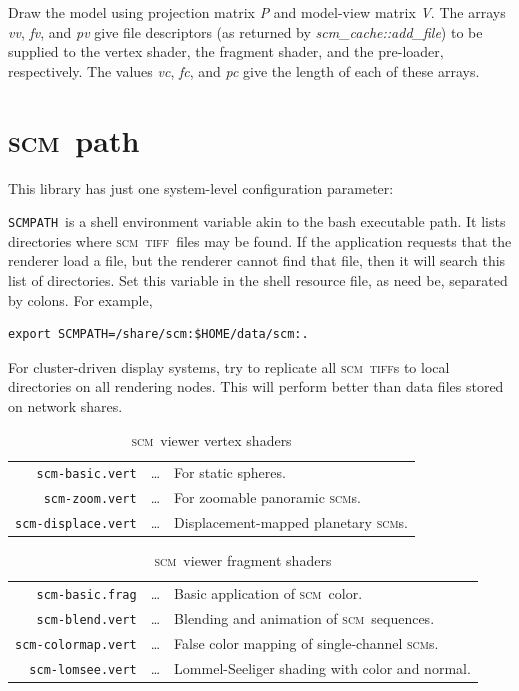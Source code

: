 \documentclass[oneside,10pt]{memoir}
\newcommand{\scm}     {\textsc{scm}}
\newcommand{\tiff}    {\textsc{tiff}}
\newcommand{\scmpath}{\texttt{SCMPATH}}
\newcommand{\B}{\bigstrut[b]}
\newcommand{\T}{\bigstrut[t]}
\begin{document}
\begin{Spacing}{1.1}
\begin{itemize}
    Draw the model using projection matrix \textit{P} and model-view matrix \textit{V}. The arrays \textit{vv}, \textit{fv}, and \textit{pv} give file descriptors (as returned by \textit{scm\_cache::add\_file}) to be supplied to the vertex shader, the fragment shader, and the pre-loader, respectively. The values \textit{vc}, \textit{fc}, and \textit{pc} give the length of each of these arrays.

\end{itemize}

\section{\scm\ path}
\label{sec:scmpath}

This library has just one system-level configuration parameter:

\scmpath\ is a shell environment variable akin to the bash executable path. It lists directories where \scm\ \tiff\ files may be found. If the application requests that the renderer load a file, but the renderer cannot find that file, then it will search this list of directories. Set this variable in the shell resource file, as need be, separated by colons. For example,

\begin{Verbatim}
export SCMPATH=/share/scm:$HOME/data/scm:.
\end{Verbatim}

For cluster-driven display systems, try to replicate all \scm\ \tiff s to local directories on all rendering nodes. This will perform better than data files stored on network shares.

\begin{table}
  \begin{tabular*}{\textwidth}{rcl}\hline
    \texttt{scm-basic.vert}    & \ldots & For static spheres. \T\\
    \texttt{scm-zoom.vert}     & \ldots & For zoomable panoramic \scm s. \\
    \texttt{scm-displace.vert} & \ldots & Displacement-mapped planetary \scm s. \B\\\hline
  \end{tabular*}
  \caption{\scm\ viewer vertex shaders}
  \label{tab:vert}
\end{table}

\begin{table}
  \begin{tabular*}{\textwidth}{rcl}\hline
    \texttt{scm-basic.frag}    & \ldots & Basic application of \scm\ color.\T\\
    \texttt{scm-blend.vert}    & \ldots & Blending and animation of \scm\ sequences.\\
    \texttt{scm-colormap.vert} & \ldots & False color mapping of single-channel \scm s.\\
    \texttt{scm-lomsee.vert}   & \ldots & Lommel-Seeliger shading with color and normal.\B\\\hline
  \end{tabular*}
  \caption{\scm\ viewer fragment shaders}
  \label{tab:frag}
\end{table}


\end{Spacing}
\end{document}
